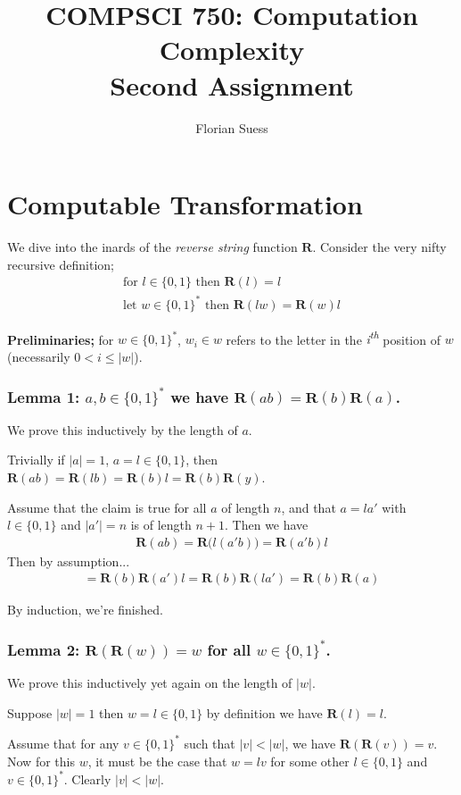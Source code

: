 \documentclass{article}
\title{COMPSCI 750: Computation Complexity \\ Second Assignment}
\author{Florian Suess}
\begin{document}
\maketitle

\section*{Computable Transformation}
We dive into the inards of the \emph{reverse string} function $\bm{R}$. Consider the very nifty recursive definition;
\begin{align*}
	\text{for } l \in \{0,1\} \text{ then } \bm{R}(l) = l \\
	\text{let } w \in \{0,1\}^* \text{ then } \bm{R}(lw) = \bm{R}(w)l
\end{align*}

\textbf{Preliminaries;} for $w \in \{0,1\}^*$, $w_i \in w$ refers to the letter in the \emph{i\textsuperscript{th}} position of $w$ (necessarily $0 < i \leq |w|$).

\subsubsection*{Lemma 1: $a,b \in \{0,1\}^*$ we have $\bm{R}(ab) = \bm{R}(b)\bm{R}(a)$.}
We prove this inductively by the length of $a$.

Trivially if $|a|=1$, $a=l\in \{0,1\}$, then $\bm{R}(ab)=\bm{R}(lb)=\bm{R}(b)l=\bm{R}(b)\bm{R}(y)$.

Assume that the claim is true for all $a$ of length $n$, and that $a=la'$ with $l\in \{0,1\}$ and $|a'|=n$ is of length $n+1$. Then we have
\begin{align*}
	\bm{R}(ab)=\bm{R}\bigl(l(a'b)\bigr)=\bm{R}(a'b)l
\end{align*}
Then by assumption...
\begin{align*}
	=\bm{R}(b)\bm{R}(a')l=\bm{R}(b)\bm{R}(la')=\bm{R}(b)\bm{R}(a)
\end{align*}

By induction, we're finished.

\subsubsection*{Lemma 2: $\bm{R}(\bm{R}(w)) = w$ for all $w \in \{0,1\}^*$.}
We prove this inductively yet again on the length of $|w|$.

Suppose $|w| = 1$ then $w = l \in \{0,1\}$ by definition we have $\bm{R}(l) = l$.

Assume that for any $v \in \{0,1\}^*$ such that $|v| < |w|$, we have $\bm{R}(\bm{R}(v)) = v$. Now for this $w$, it must be the case that $w = lv$ for some other $l \in \{0,1\}$ and $v \in \{0,1\}^*$. Clearly $|v| < |w|$.
\end{document}

